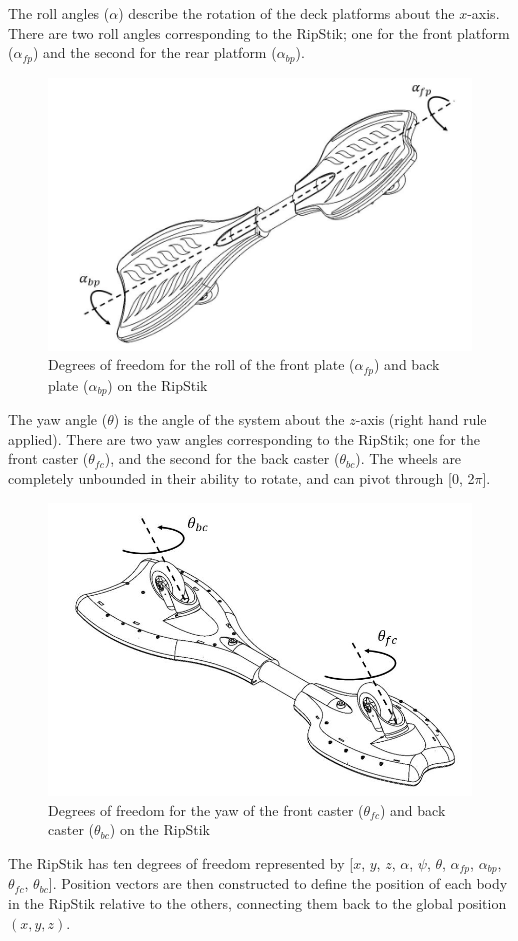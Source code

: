 The roll angles ($\alpha$) describe the rotation of the deck platforms about the $x$-axis. There are two roll angles corresponding to the RipStik; one for the front platform ($\alpha_{fp}$) and the second for the rear platform ($\alpha_{bp}$).
\begin{figure}[!htb]
	\centering
	\includegraphics[width=\linewidth]{DOFpart2.jpg}
	\caption{Degrees of freedom for the roll of the front plate ($\alpha_{fp}$) and back plate ($\alpha_{bp}$) on the RipStik}\label{fig:RipStikroll}
	\endminipage
\end{figure}

The yaw angle ($\theta$) is the angle of the system about the $z$-axis (right hand rule applied). There are two yaw angles corresponding to the RipStik; one for the front caster ($\theta_{fc}$), and the second for the back caster ($\theta_{bc}$). The wheels are completely unbounded in their ability to rotate, and can pivot through [0, 2$\pi$].
\begin{figure}[!htb]
	\centering
	\includegraphics[width=\linewidth]{DOFpart3.jpg}
	\caption{Degrees of freedom for the yaw of the front caster ($\theta_{fc}$) and back caster ($\theta_{bc}$) on the RipStik }\label{fig:RipStikyaw}
	\endminipage
\end{figure}
The RipStik has ten degrees of freedom represented by [$x$, $y$, $z$, $\alpha$, $\psi$, $\theta$, $\alpha_{fp}$, $\alpha_{bp}$, $\theta_{fc}$, $\theta_{bc}$].
Position vectors are then constructed to define the position of each body in the RipStik relative to the others, connecting them back to the global position $(x,y,z)$.
